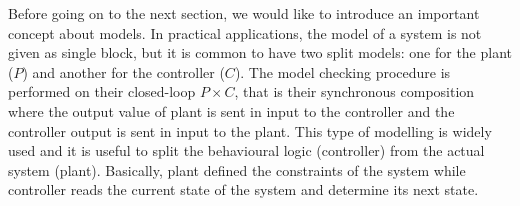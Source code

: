Before going on to the next section, we would like to introduce an important concept about models.
In practical applications, the model of a system is not given as single block, but it is common to have two split models: one for the plant ($P$) and another for the controller ($C$).
The model checking procedure is performed on their closed-loop $P \times C$, that is their synchronous composition where the output value of plant is sent in input to the controller and the controller output is sent in input to the plant.
This type of modelling is widely used and it is useful to split the behavioural logic (controller) from the actual system (plant). 
Basically, plant defined the constraints of the system while controller reads the current state of the system and determine its next state. 
